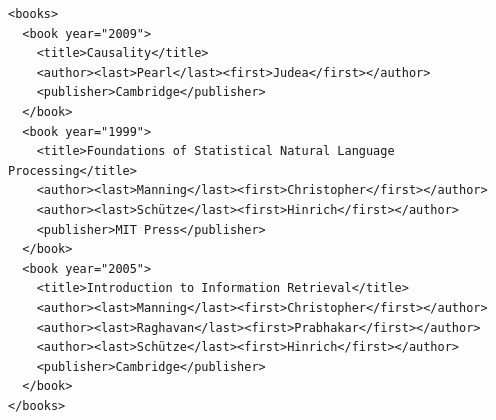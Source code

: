 


\newsavebox\biblioXML
\begin{lrbox}{\biblioXML}
\begin{lstlisting}[style=markup]
<books>
  <book year="2009">
    <title>Causality</title>
    <author><last>Pearl</last><first>Judea</first></author>
    <publisher>Cambridge</publisher>
  </book>
  <book year="1999">
    <title>Foundations of Statistical Natural Language Processing</title>
    <author><last>Manning</last><first>Christopher</first></author>
    <author><last>Schütze</last><first>Hinrich</first></author>
    <publisher>MIT Press</publisher>
  </book>
  <book year="2005">
    <title>Introduction to Information Retrieval</title>
    <author><last>Manning</last><first>Christopher</first></author>
    <author><last>Raghavan</last><first>Prabhakar</first></author>
    <author><last>Schütze</last><first>Hinrich</first></author>
    <publisher>Cambridge</publisher>
  </book>
</books>
\end{lstlisting}
\end{lrbox}


